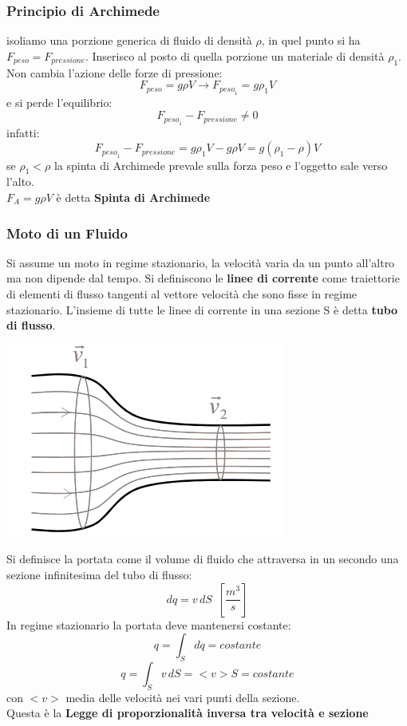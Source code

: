 \documentclass[a4paper,12pt, oneside]{book}
\begin{document}
\subsubsection{Principio di Archimede}
isoliamo una porzione generica di fluido di densità $\rho$, in quel punto si ha $F_{peso}=F_{pressione}$. Inserisco al posto di quella porzione un materiale di densità $\rho_1$. Non cambia l'azione delle forze di pressione:
$$F_{peso}=g\rho V\to F_{{peso}_1}=g\rho_1 V$$
e si perde l'equilibrio:
$$F_{{peso}_1}-F_{pressione}\neq 0$$
infatti:
$$F_{{peso}_1}-F_{pressione}=g\rho_1V-g\rho V=g(\rho_1-\rho)V$$
se $\rho_1<\rho$ la spinta di Archimede prevale sulla forza peso e l'oggetto sale verso l'alto. \\
$F_A=g\rho V$ è detta \textbf{Spinta di Archimede}
\subsubsection{Moto di un Fluido}
Si assume un moto in regime stazionario, la velocità varia da un punto all'altro ma non dipende dal tempo. Si definiscono le \textbf{linee di corrente} come traiettorie di elementi di flusso tangenti al vettore velocità che sono fisse in regime stazionario. L'insieme di tutte le linee di corrente in una sezione S è detta \textbf{tubo di flusso}.
\begin{center}
\includegraphics[scale=0.5]{img/flu5.png}
\end{center}
Si definisce la portata come il volume di fluido che attraversa in un secondo una sezione infinitesima del tubo di flusso:
$$dq=v\,dS\,\,\,\left[\frac{m^3}{s}\right]$$
In regime stazionario la portata deve mantenersi costante:
$$q=\int_S dq=costante$$
$$q=\int_S v\,dS=<v>S=costante$$
con $<v>$ media delle velocità nei vari punti della sezione.\\
Questa è la \textbf{Legge di proporzionalità inversa tra velocità e sezione}
\end{document}

